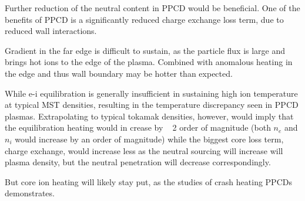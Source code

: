 Further reduction of the neutral content in PPCD would be beneficial. One of the benefits of PPCD is a significantly reduced charge exchange loss term, due to reduced wall interactions. 


Gradient in the far edge is difficult to sustain, as the particle flux is large and brings hot ions to the edge of the plasma. Combined with anomalous heating in the edge and thus wall boundary may be hotter than expected. 

While e-i equilibration is generally insufficient in sustaining high ion temperature at typical MST densities, resulting in the temperature discrepancy seen in PPCD plasmas. Extrapolating to typical tokamak densities, however, would imply that the equilibration heating would in crease by ~ 2 order of magnitude (both $n_e$ and $n_i$ would increase by an order of magnitude) while the biggest core loss term, charge exchange, would increase less as the neutral sourcing will increase will plasma density, but the neutral penetration will decrease correspondingly. 

But core ion heating will likely stay put, as the studies of crash heating PPCDs demonstrates.


